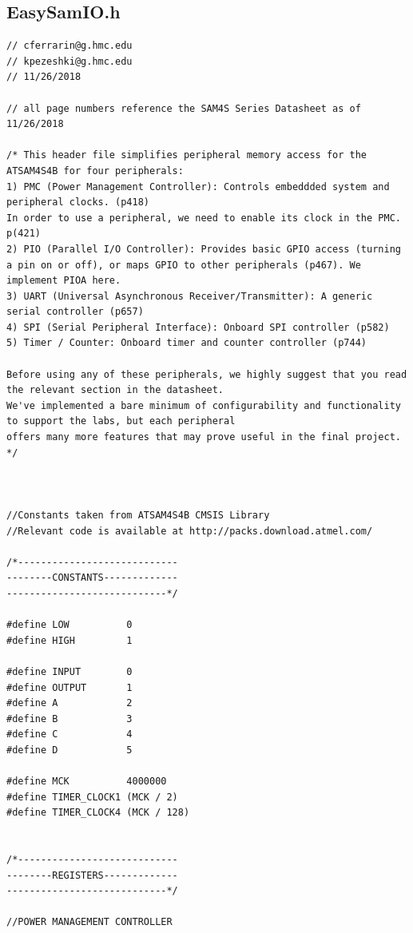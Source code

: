 \documentclass[12pt]{article}
\begin{document}
\subsection{EasySamIO.h}
\begin{tiny}
\begin{verbatim}
// cferrarin@g.hmc.edu
// kpezeshki@g.hmc.edu
// 11/26/2018

// all page numbers reference the SAM4S Series Datasheet as of 11/26/2018

/* This header file simplifies peripheral memory access for the ATSAM4S4B for four peripherals:
1) PMC (Power Management Controller): Controls embeddded system and peripheral clocks. (p418)
In order to use a peripheral, we need to enable its clock in the PMC. p(421)
2) PIO (Parallel I/O Controller): Provides basic GPIO access (turning a pin on or off), or maps GPIO to other peripherals (p467). We implement PIOA here.
3) UART (Universal Asynchronous Receiver/Transmitter): A generic serial controller (p657)
4) SPI (Serial Peripheral Interface): Onboard SPI controller (p582)
5) Timer / Counter: Onboard timer and counter controller (p744)

Before using any of these peripherals, we highly suggest that you read the relevant section in the datasheet. 
We've implemented a bare minimum of configurability and functionality to support the labs, but each peripheral
offers many more features that may prove useful in the final project.
*/



//Constants taken from ATSAM4S4B CMSIS Library
//Relevant code is available at http://packs.download.atmel.com/

/*----------------------------
--------CONSTANTS-------------
----------------------------*/

#define LOW          0
#define HIGH         1

#define INPUT        0
#define OUTPUT       1
#define A            2
#define B            3
#define C            4
#define D            5

#define MCK          4000000
#define TIMER_CLOCK1 (MCK / 2)
#define TIMER_CLOCK4 (MCK / 128)


/*----------------------------
--------REGISTERS-------------
----------------------------*/

//POWER MANAGEMENT CONTROLLER


\end{verbatim}
\end{tiny}
\end{document}
